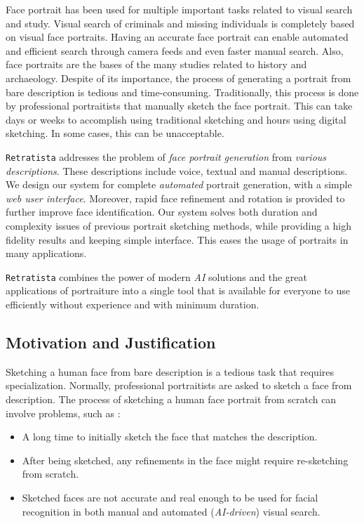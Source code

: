 Face portrait has been used for multiple important tasks related to visual search and study. Visual search of criminals and missing individuals is completely based on visual face portraits. Having an accurate face portrait can enable automated and efficient search through camera feeds and even faster manual search. Also, face portraits are the bases of the many studies related to history and archaeology. Despite of its importance, the process of generating a portrait from bare description is tedious and time-consuming. Traditionally, this process is done by professional portraitists that manually sketch the face portrait. This can take days or weeks to accomplish using traditional sketching and hours using digital sketching. In some cases, this can be unacceptable.

\texttt{Retratista} addresses the problem of \emph{face portrait generation} from \emph{various descriptions}. These descriptions include voice, textual and manual descriptions. We design our system for complete \emph{automated} portrait generation, with a simple \emph{web user interface}. Moreover, rapid face refinement and rotation is provided to further improve face identification. Our system solves both duration and complexity issues of previous portrait sketching methods, while providing a high fidelity results and keeping simple interface. This eases the usage of portraits in many applications.

\texttt{Retratista} combines the power of modern \emph{AI} solutions and the great applications of portraiture into a single tool that is available for everyone to use efficiently without experience and with minimum duration. 

\subsection{Motivation and Justification}
Sketching a human face from bare description is a tedious task that requires specialization. Normally, professional portraitists are asked to sketch a face from description. The process of sketching a human face portrait from scratch can involve problems, such as :
\begin{itemize}
    \item A long time to initially sketch the face that matches the description.
    \item After being sketched, any refinements in the face might require re-sketching from scratch.
    \item Sketched faces are not accurate and real enough to be used for facial recognition in both manual and automated (\emph{AI-driven}) visual search.
\end{itemize}

